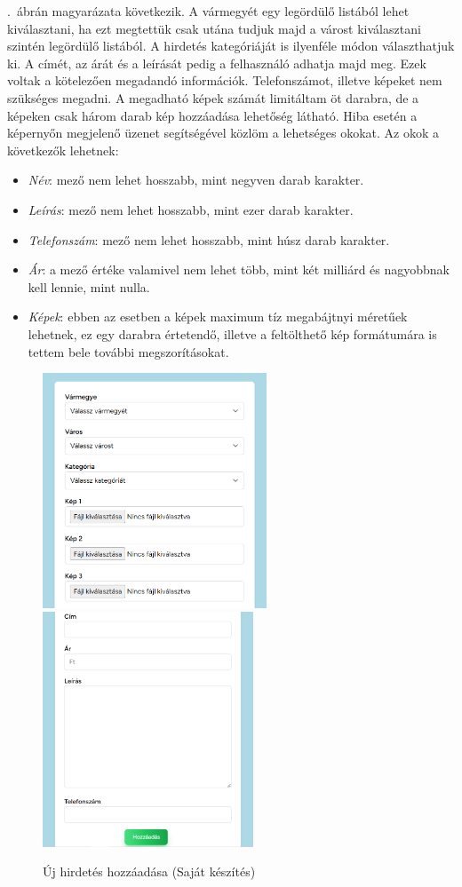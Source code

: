 \documentclass[]{thesis-ekf}
\theoremstyle{definition}
\theoremstyle{remark}
\begin{document}
		.~ábrán magyarázata következik. A vármegyét egy legördülő listából lehet kiválasztani, ha ezt megtettük csak utána tudjuk majd a várost kiválasztani szintén legördülő listából. A hirdetés kategóriáját is ilyenféle módon választhatjuk ki. A címét, az árát és a leírását pedig a felhasználó adhatja majd meg. Ezek voltak a kötelezően megadandó információk. Telefonszámot, illetve képeket nem szükséges megadni. A megadható képek számát limitáltam öt darabra, de a képeken csak három darab kép hozzáadása lehetőség látható. Hiba esetén a képernyőn megjelenő üzenet segítségével közlöm a lehetséges okokat. Az okok a következők lehetnek:
		\begin{itemize}
			\item \emph{Név}: mező nem lehet hosszabb, mint negyven darab karakter.
			\item \emph{Leírás}: mező nem lehet hosszabb, mint ezer darab karakter.
			\item \emph{Telefonszám}:  mező nem lehet hosszabb, mint húsz darab karakter.
			\item \emph{Ár}: a mező értéke valamivel nem lehet több, mint két milliárd és nagyobbnak kell lennie, mint nulla.
			\item \emph{Képek}: ebben az esetben a képek maximum tíz megabájtnyi méretűek lehetnek, ez egy darabra értetendő, illetve a feltölthető kép formátumára is tettem bele további megszorításokat.
		\end{itemize}
		\begin{figure}[ht!]
			\centering
			\includegraphics[height=7cm]{./felhasznaloi/hozzadas1}
			\includegraphics[height=7cm]{./felhasznaloi/hozzadas2}
			\caption{Új hirdetés hozzáadása (Saját készítés)} 
			\label{hirdetes-hozzadas-muvelet}
		\end{figure}
		
\end{document}
